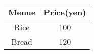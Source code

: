 \documentclass{jarticle}
\begin{document}
\begin{table}[htbp]
	\caption{}
	\label{}
	\centering
	\begin{tabular}{|c|c|} \hline
	Menue & Price(yen) \\ \hline
	Rice & 100 \\ \hline
	Bread & 120 \\ \hline
	\end{tabular}
\end{table}
\end{document}
